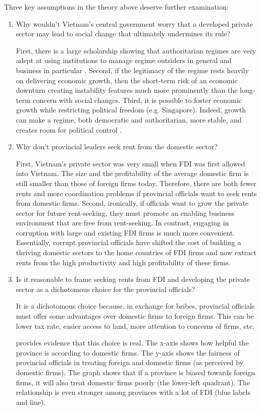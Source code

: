 Three key assumptions in the theory above deserve further examination:
\begin{enumerate}
\item Why wouldn't Vietnam's central government worry that a developed private sector may lead to social change that ultimately undermines its rule?

First, there is a large scholarship showing that authoritarian regimes are very adept at using institutions to manage regime outsiders in general and business in particular \citep{Gandhi2006, Gandhi2008, Wright2008, Le2015}. Second, if the legitimacy of the regime rests heavily on delivering economic growth, then the short-term risk of an economic downturn creating instability features much more prominently than the long-term concern with social changes. Third, it is possible to foster economic growth while restricting political freedom (e.g. Singapore). Indeed, growth can make a regime, both democratic and authoritarian, more stable, and creates room for political control \citep{Przeworski1997}.

\item Why don't provincial leaders seek rent from the domestic sector? 

First, Vietnam's private sector was very small when FDI was first allowed into Vietnam. The size and the profitability of the average domestic firm is still smaller than those of foreign firms today. Therefore, there are both fewer rents and more coordination problems if provincial officials want to seek rents from domestic firms. Second, ironically, if officials want to grow the private sector for future rent-seeking, they must promote an enabling business environment that are free from rent-seeking. In contrast, engaging in corruption with large and existing FDI firms is much more convenient. Essentially, corrupt provincial officials have shifted the cost of building a thriving domestic sectors to the home countries of FDI firms and now extract rents from the high productivity and high profitability of these firms. 

\item Is it reasonable to frame seeking rents from FDI and developing the private sector as a dichotomous choice for the provincial officials?

It is a dichotomous choice because, in exchange for bribes, provincial officials must offer some advantages over domestic firms to foreign firms. This can be lower tax rate, easier access to land, more attention to concerns of firms, etc.

 provides evidence that this choice is real. The x-axis shows how helpful the province is according to domestic firms. The y-axis shows the fairness of provincial officials in treating foreign and domestic firms (as perceived by domestic firms). The graph shows that if a province is biased towards foreign firms, it will also treat domestic firms poorly (the lower-left quadrant). The relationship is even stronger among provinces with a lot of FDI (blue labels and line).
\end{enumerate}

